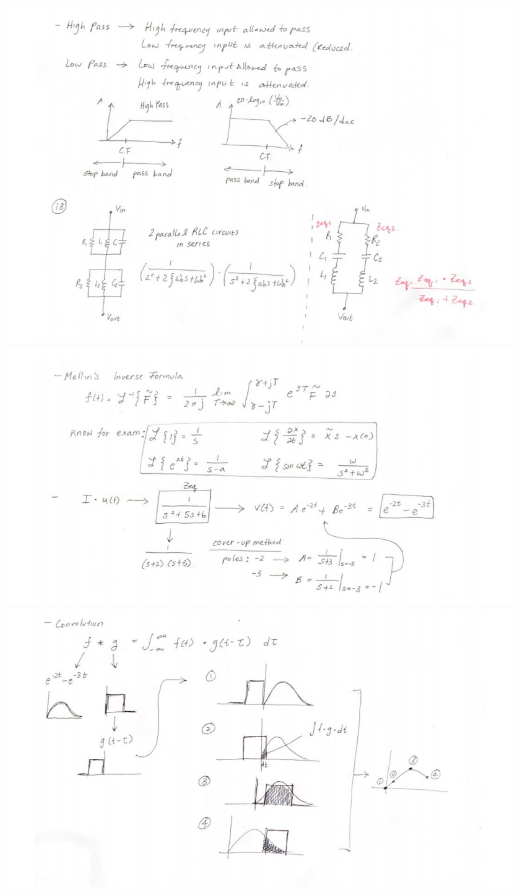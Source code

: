 \documentclass[11pt]{book}
\begin{document}
\\
\includegraphics[width=\textwidth]{figures/3-19_Board5.png}
\\
\includegraphics[width=\textwidth]{figures/3-19_Board6.png}
\\
\includegraphics[width=\textwidth]{figures/3-19_Board7.png}
\end{document}
